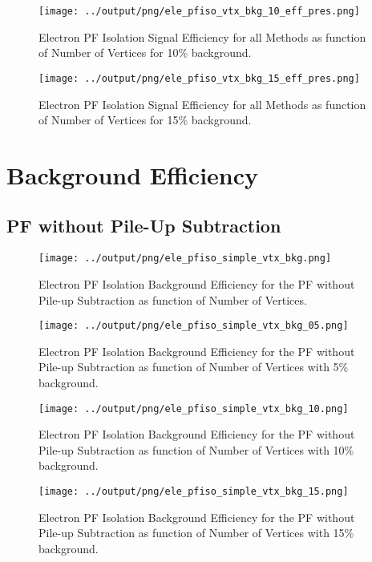 \documentclass[11pt]{book}
\begin{document}
\begin{figure}[htb]
\centering
\texttt{[image: ../output/png/ele\_pfiso\_vtx\_bkg\_10\_eff\_pres.png]}
\caption{Electron PF Isolation Signal Efficiency for all Methods as function of Number of Vertices for 10\% background.}
\label{fig:ele_pfiso_vtx_bkg_10_eff_pres}
\end{figure}

\begin{figure}[htb]
\centering
\texttt{[image: ../output/png/ele\_pfiso\_vtx\_bkg\_15\_eff\_pres.png]}
\caption{Electron PF Isolation Signal Efficiency for all Methods as function of Number of Vertices for 15\% background.}
\label{fig:ele_pfiso_vtx_bkg_15_eff_pres}
\end{figure}
\clearpage

\chapter{Background Efficiency}
\section{PF without Pile-Up Subtraction}
\begin{figure}[htb]
\centering
\texttt{[image: ../output/png/ele\_pfiso\_simple\_vtx\_bkg.png]}
\caption{Electron PF Isolation Background Efficiency for the PF without Pile-up Subtraction as function of Number of Vertices.}
\label{fig:ele_pfiso_vtx_bkg_simple}
\end{figure}

\begin{figure}[htb]
\centering
\texttt{[image: ../output/png/ele\_pfiso\_simple\_vtx\_bkg\_05.png]}
\caption{Electron PF Isolation Background Efficiency for the PF without Pile-up Subtraction as function of Number of Vertices with 5\% background.}
\label{fig:ele_pfiso_vtx_bkg_simple_bkg_05}
\end{figure}

\begin{figure}[htb]
\centering
\texttt{[image: ../output/png/ele\_pfiso\_simple\_vtx\_bkg\_10.png]}
\caption{Electron PF Isolation Background Efficiency for the PF without Pile-up Subtraction as function of Number of Vertices with 10\% background.}
\label{fig:ele_pfiso_vtx_bkg_simple_bkg_10}
\end{figure}

\begin{figure}[htb]
\centering
\texttt{[image: ../output/png/ele\_pfiso\_simple\_vtx\_bkg\_15.png]}
\caption{Electron PF Isolation Background Efficiency for the PF without Pile-up Subtraction as function of Number of Vertices with 15\% background.}
\label{fig:ele_pfiso_vtx_bkg_simple_bkg_15}
\end{figure}
\end{document}
